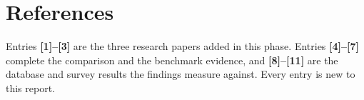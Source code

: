 \documentclass[11pt,a4paper]{article}
\begin{document}
\section*{\sffamily\color{blue800}References}

Entries \textbf{[1]--[3]} are the three research papers added in this
phase. Entries \textbf{[4]--[7]} complete the comparison and the
benchmark evidence, and \textbf{[8]--[11]} are the database and survey
results the findings measure against. Every entry is new to this report.

\renewcommand{\section}[2]{}
\end{document}
